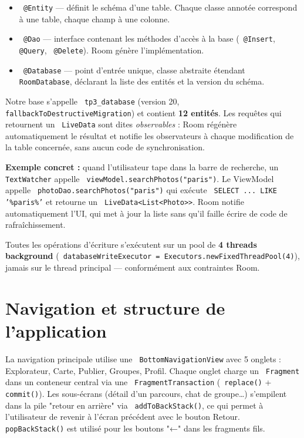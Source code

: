 \documentclass[a4paper,12pt,openany]{report}
\newcommand{\ic}[1]{\texttt{\small\colorbox{lightbg}{\color{navy!90} #1}}}
\begin{document}
\begin{itemize}
  \item \ic{@Entity} — définit le schéma d'une table. Chaque classe annotée
    correspond à une table, chaque champ à une colonne.
  \item \ic{@Dao} — interface contenant les méthodes d'accès à la base
    (\ic{@Insert}, \ic{@Query}, \ic{@Delete}). Room génère l'implémentation.
  \item \ic{@Database} — point d'entrée unique, classe abstraite étendant
    \ic{RoomDatabase}, déclarant la liste des entités et la version du schéma.
\end{itemize}

Notre base s'appelle \ic{tp3\_database} (version 20, \ic{fallbackToDestructiveMigration})
et contient \textbf{12 entités}. Les requêtes qui retournent un \ic{LiveData}
sont dites \emph{observables} : Room régénère automatiquement le résultat et
notifie les observateurs à chaque modification de la table concernée, sans
aucun code de synchronisation.

\begin{tcolorbox}[enhanced,colback=lightbg,colframe=bord,arc=5pt,boxrule=0.5pt,
  left=8pt,right=8pt,top=8pt,bottom=8pt]
\textbf{Exemple concret :} quand l'utilisateur tape dans la barre de recherche,
un \ic{TextWatcher} appelle \ic{viewModel.searchPhotos("paris")}. Le ViewModel
appelle \ic{photoDao.searchPhotos("paris")} qui exécute \ic{SELECT ... LIKE '\%paris\%'}
et retourne un \ic{LiveData<List<Photo>>}. Room notifie automatiquement l'UI,
qui met à jour la liste sans qu'il faille écrire de code de rafraîchissement.
\end{tcolorbox}

Toutes les opérations d'écriture s'exécutent sur un pool de \textbf{4 threads
background} (\ic{databaseWriteExecutor = Executors.newFixedThreadPool(4)}),
jamais sur le thread principal — conformément aux contraintes Room.

\section{Navigation et structure de l'application}

La navigation principale utilise une \ic{BottomNavigationView} avec 5 onglets :
Explorateur, Carte, Publier, Groupes, Profil. Chaque onglet charge un \ic{Fragment}
dans un conteneur central via une \ic{FragmentTransaction} (\ic{replace()} +
\ic{commit()}). Les sous-écrans (détail d'un parcours, chat de groupe…)
s'empilent dans la pile "retour en arrière" via \ic{addToBackStack()}, ce qui
permet à l'utilisateur de revenir à l'écran précédent avec le bouton Retour.
\ic{popBackStack()} est utilisé pour les boutons "←" dans les fragments fils.
\end{document}
